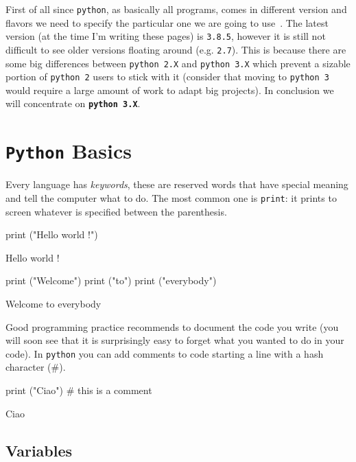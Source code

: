 First of all since \texttt{python}, as basically all programs, comes in different version and flavors we need to specify the particular one we are going to use~\cite{python_versions}.
The latest version (at the time I'm writing these pages) is \texttt{3.8.5}, however it is still not difficult to see older versions floating around (e.g. \texttt{2.7}).
This is because there are some big differences between \texttt{python 2.X} and \texttt{python 3.X} which prevent a sizable portion of \texttt{python 2} users to stick with it (consider that moving to \texttt{python 3} would require a large amount of work to adapt big projects).
In conclusion we will concentrate on \textbf{\texttt{python~3.X}}.

\section{\texttt{Python} Basics}
\label{python-basics}

Every language has \emph{keywords}, these are reserved words that have special meaning and tell the computer what to do. The most common one is \texttt{print}: it prints to screen whatever is specified between the parenthesis.

\begin{ipython}
print ("Hello world !")
\end{ipython}
\begin{ioutput}
Hello world !
\end{ioutput}
\begin{ipython}
print ("Welcome")
print ("to")
print ("everybody")
\end{ipython}
\begin{ioutput}
Welcome
to
everybody
\end{ioutput}

Good programming practice recommends to document the code you write (you will soon see that it is surprisingly easy to forget what you wanted to do in your code). In \texttt{python} you can add comments to code starting a line with a hash character (\#).

\begin{ipython}
print ("Ciao") # this is a comment 
\end{ipython}
\begin{ioutput}
Ciao
\end{ioutput}

\subsection{Variables}\label{variables}

